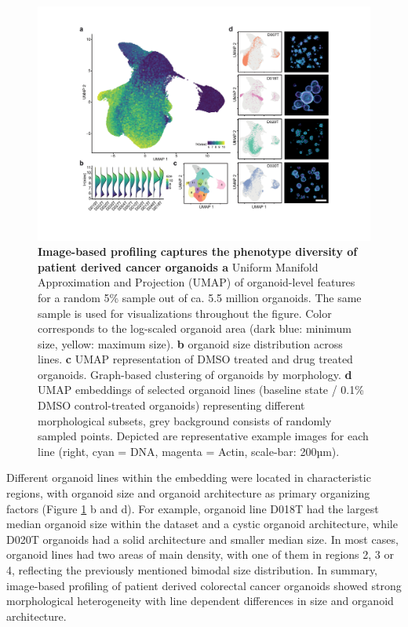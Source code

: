 \begin{flushleft}
\clearpage

\begin{figure}[h]
\centering
\includegraphics[width=\textwidth,
                height=\textheight,
                keepaspectratio]{figures/promise/pdf/fig_1_4.pdf}
\caption{\textbf{Image-based profiling captures the phenotype diversity of patient derived cancer organoids a} Uniform Manifold Approximation and Projection (UMAP) of organoid-level features for a random 5\% sample out of ca. 5.5 million organoids. The same sample is used for visualizations throughout the figure. Color corresponds to the log-scaled organoid area (dark blue: minimum size, yellow: maximum size). \textbf{b} organoid size distribution across lines. \textbf{c} UMAP representation of DMSO treated and drug treated organoids. Graph-based clustering of organoids by morphology. \textbf{d} UMAP embeddings of selected organoid lines (baseline state / 0.1\% DMSO control-treated organoids) representing different morphological subsets, grey background consists of randomly sampled points. Depicted are representative example images for each line (right, cyan = DNA, magenta = Actin, scale-bar: 200µm).}
\label{fig_140}
\end{figure}
\bigbreak

Different organoid lines within the embedding were located in characteristic regions, with organoid size and organoid architecture as primary organizing factors (Figure \ref{fig_140} b and d). For example, organoid line D018T had the largest median organoid size within the dataset and a cystic organoid architecture, while D020T organoids had a solid architecture and smaller median size. In most cases, organoid lines had two areas of main density, with one of them in regions 2, 3 or 4, reflecting the previously mentioned bimodal size distribution. In summary, image-based profiling of patient derived colorectal cancer organoids showed strong morphological heterogeneity with line dependent differences in size and organoid architecture.


\end{flushleft}
